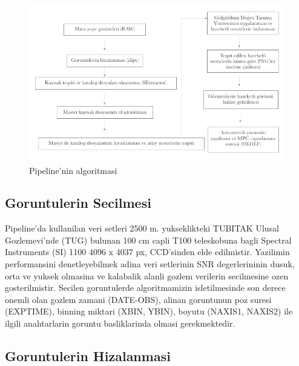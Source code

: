 \documentclass[review]{elsarticle}
\begin{document}
\begin{figure}[!t]
  \centering
  \includegraphics[scale=0.50]{algoritma}
  \caption{Pipeline'nin algoritmasi}
  \label{fig:algoritma}
\end{figure}

\subsection{Goruntulerin Secilmesi}

Pipeline’da kullanilan veri setleri 2500 m. yukseklikteki TUBITAK Ulusal Gozlemevi’nde (TUG) bulunan 100 cm capli T100 teleskobuna bagli Spectral Instruments (SI) 1100 4096 x 4037 px, CCD’sinden elde edilmistir. Yazilimin performansini denetleyebilmek adina veri setlerinin SNR degerlerininin dusuk, orta ve yuksek olmasina ve kalabalik alanli gozlem verilerin secilmesine ozen gosterilmistir. Secilen goruntulerde algoritmamizin isletilmesinde son derece onemli olan gozlem zamani (DATE-OBS), alinan   goruntunun poz suresi (EXPTIME), binning miktari (XBIN, YBIN), boyutu (NAXIS1, NAXIS2) ile ilgili anahtarlarin goruntu basliklarinda olmasi gerekmektedir.

\subsection{Goruntulerin Hizalanmasi} \label{sec:align}
\end{document}
